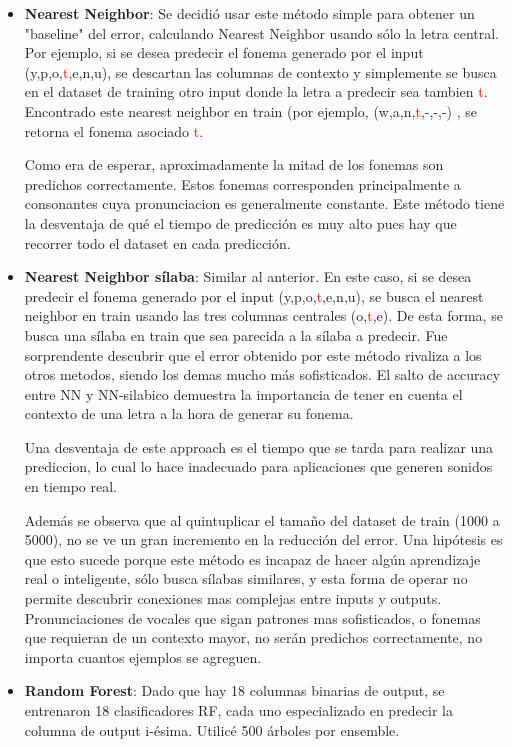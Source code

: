 \documentclass[paper=a4, fontsize=11pt]{scrartcl} %
\numberwithin{equation}{section} %
\numberwithin{figure}{section} %
\numberwithin{table}{section} %
\begin{document}
\begin{itemize}
\item \textbf{Nearest Neighbor}: Se decidió usar este método simple para obtener un "baseline" del error, calculando Nearest Neighbor usando sólo la letra central. Por ejemplo, si se desea predecir el fonema generado por el input (y,p,o,\textcolor{red}{t},e,n,u), se descartan las columnas de contexto y simplemente se busca en el dataset de training otro input donde la letra a predecir sea tambien \textcolor{red}{t}. Encontrado este nearest neighbor en train (por ejemplo, (w,a,n,\textcolor{red}{t},-,-,-) , se retorna el fonema asociado \textcolor{red}{t}.

Como era de esperar, aproximadamente la mitad de los fonemas son predichos correctamente. Estos fonemas corresponden principalmente a consonantes cuya pronunciacion es generalmente constante. Este método tiene la desventaja de qué el tiempo de predicción es muy alto pues hay que recorrer todo el dataset en cada predicción.

\item \textbf{Nearest Neighbor sílaba}: Similar al anterior. En este caso, si se desea predecir el fonema generado por el input (y,p,o,\textcolor{red}{t},e,n,u), se busca el nearest neighbor en train usando las tres columnas centrales (o,\textcolor{red}{t},e). De esta forma, se busca una sílaba en train que sea parecida a la sílaba a predecir. Fue sorprendente descubrir que el error obtenido por este método rivaliza a los otros metodos, siendo los demas mucho más sofisticados. El salto de accuracy entre NN y NN-silabico demuestra la importancia de tener en cuenta el contexto de una letra a la hora de generar su fonema.

Una desventaja de este approach es el tiempo que se tarda para realizar una prediccion, lo cual lo hace inadecuado para aplicaciones que generen sonidos en tiempo real. 

Además se observa que al quintuplicar el tamaño del dataset de train (1000 a 5000), no se ve un gran incremento en la reducción del error. Una hipótesis es que esto sucede porque este método es incapaz de hacer algún aprendizaje real o inteligente, sólo busca sílabas similares, y esta forma de operar no permite descubrir conexiones mas complejas entre inputs y outputs. Pronunciaciones de vocales que sigan patrones mas sofisticados, o fonemas que requieran de un contexto mayor, no serán predichos correctamente, no importa cuantos ejemplos se agreguen.

\item \textbf{Random Forest}: Dado que hay 18 columnas binarias de output, se entrenaron 18 clasificadores RF, cada uno especializado en predecir la columna de output i-ésima. Utilicé 500 árboles por ensemble.


\end{itemize}
\end{document}
